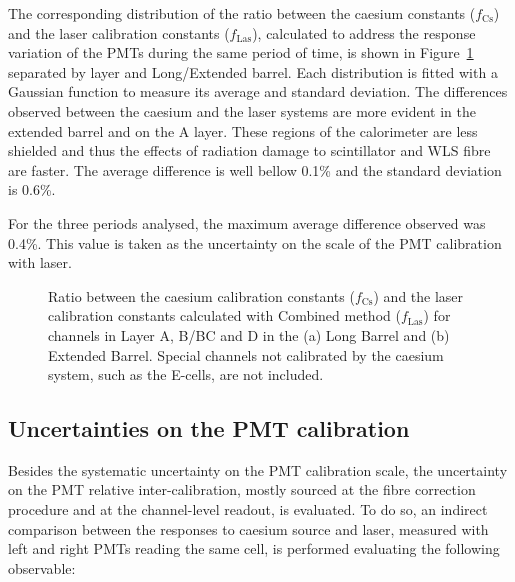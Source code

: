 The corresponding distribution of the ratio between the caesium constants ($f_\mathrm{Cs}$) and the laser calibration constants ($f_\mathrm{Las}$), calculated to address the response variation of the PMTs during the same period of time, 
is shown in Figure~\ref{fig:CsLas2015Nov_1d} 
separated by layer and Long/Extended barrel. 
Each distribution is fitted with a Gaussian function to measure its average and standard deviation. The differences observed between the caesium and the laser systems are more evident in the extended barrel and on the A layer. These regions of the calorimeter are less shielded and thus the effects of radiation damage to scintillator and WLS fibre are faster. The average difference is well bellow 0.1\% and the standard deviation is 0.6\%.

For the three periods analysed, the maximum average difference observed was 0.4\%. This value is taken as the uncertainty on the scale of the PMT calibration with laser.

\begin{figure}[htbp]
\centering
{}
\caption{Ratio between the caesium calibration constants ($f_\mathrm{Cs}$) and the laser calibration constants calculated with Combined method ($f_\mathrm{Las}$) for channels in Layer A, B/BC and D in the (a) Long Barrel and (b) Extended Barrel. Special channels not calibrated by the caesium system, such as the E-cells, are not included.}
\label{fig:CsLas2015Nov_1d}
\end{figure}

\subsection{Uncertainties on the PMT calibration}

Besides the systematic uncertainty on the PMT calibration scale, the uncertainty on the PMT relative inter-calibration, mostly sourced at the fibre correction procedure and at the channel-level readout, is evaluated. To do so, an indirect comparison between the responses to caesium source and laser, measured with left and right PMTs reading the same cell, is performed evaluating the following observable: 

